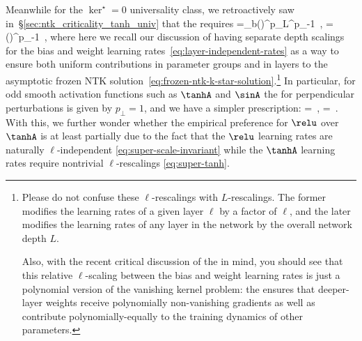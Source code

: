 Meanwhile for the $\ker^\star=0$ universality class, we retroactively saw in~\S\ref{sec:ntk_criticality_tanh_univ} that the  requires
\be\label{eq:super-tanh-general}
\eta\Lb{\ell}=\eta\widetilde{\lambda}_b\le(\ri)^{p_{\perp}}L^{p_{\perp}-1}\, , \qquad {}=\le(\ri)^{p_{\perp}-1}\, ,
\ee
where here we recall our discussion of having separate depth scalings for the bias and weight learning rates~\eqref{eq:layer-independent-rates} as a way to ensure both uniform contributions in parameter groups and in layers to the asymptotic frozen NTK solution~\eqref{eq:frozen-ntk-k-star-solution}.\footnote{
    Please do not confuse these $\ell$-rescalings with $L$-rescalings. The former modifies the learning rates of a given layer $\ell$ by a factor of $\ell$, and the later modifies the learning rates of any layer in the network by the overall network depth $L$.


Also, with the recent critical discussion of the  in mind, you should see that this relative $\ell$-scaling between the bias and weight learning rates is just a polynomial version of the vanishing kernel problem: the  ensures that deeper-layer weights receive polynomially non-vanishing gradients as well as contribute polynomially-equally to the training dynamics of other parameters.
}
In particular, for odd smooth activation functions such as $\tanhA$ and $\sinA$ the  for perpendicular perturbations is given by $p_{\perp}=1$, and we have a simpler prescription:
\be\label{eq:super-tanh}
\eta\Lb{\ell}=\, , \qquad {}=\, .
\ee
With this, we further wonder whether the empirical preference for $\relu$ over $\tanhA$ is at least partially due to the fact that the $\relu$ learning rates are naturally $\ell$-independent \eqref{eq:super-scale-invariant} while the $\tanhA$ learning rates require nontrivial $\ell$-rescalings \eqref{eq:super-tanh}.

